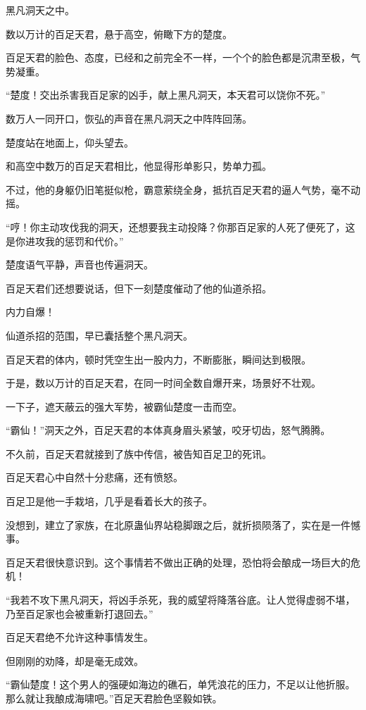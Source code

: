 
\begin{this_body}

黑凡洞天之中。

数以万计的百足天君，悬于高空，俯瞰下方的楚度。

百足天君的脸色、态度，已经和之前完全不一样，一个个的脸色都是沉肃至极，气势凝重。

“楚度！交出杀害我百足家的凶手，献上黑凡洞天，本天君可以饶你不死。”

数万人一同开口，恢弘的声音在黑凡洞天之中阵阵回荡。

楚度站在地面上，仰头望去。

和高空中数万的百足天君相比，他显得形单影只，势单力孤。

不过，他的身躯仍旧笔挺似枪，霸意萦绕全身，抵抗百足天君的逼人气势，毫不动摇。

“哼！你主动攻伐我的洞天，还想要我主动投降？你那百足家的人死了便死了，这是你进攻我的惩罚和代价。”

楚度语气平静，声音也传遍洞天。

百足天君们还想要说话，但下一刻楚度催动了他的仙道杀招。

内力自爆！

仙道杀招的范围，早已囊括整个黑凡洞天。

百足天君的体内，顿时凭空生出一股内力，不断膨胀，瞬间达到极限。

于是，数以万计的百足天君，在同一时间全数自爆开来，场景好不壮观。

一下子，遮天蔽云的强大军势，被霸仙楚度一击而空。

“霸仙！”洞天之外，百足天君的本体真身眉头紧皱，咬牙切齿，怒气腾腾。

不久前，百足天君就接到了族中传信，被告知百足卫的死讯。

百足天君心中自然十分悲痛，还有愤怒。

百足卫是他一手栽培，几乎是看着长大的孩子。

没想到，建立了家族，在北原蛊仙界站稳脚跟之后，就折损陨落了，实在是一件憾事。

百足天君很快意识到。这个事情若不做出正确的处理，恐怕将会酿成一场巨大的危机！

“我若不攻下黑凡洞天，将凶手杀死，我的威望将降落谷底。让人觉得虚弱不堪，乃至百足家也会被重新打退回去。”

百足天君绝不允许这种事情发生。

但刚刚的劝降，却是毫无成效。

“霸仙楚度！这个男人的强硬如海边的礁石，单凭浪花的压力，不足以让他折服。那么就让我酿成海啸吧。”百足天君脸色坚毅如铁。


\end{this_body}
